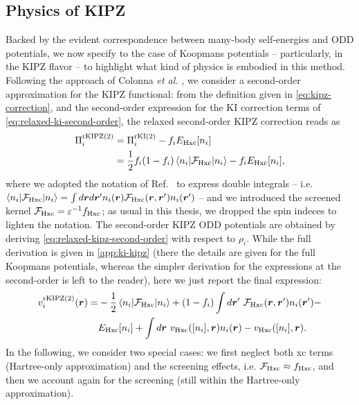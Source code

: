 \subsection{Physics of KIPZ\label{sec:kipz-cohsex}}
Backed by the evident correspondence between many-body self-energies and ODD potentials, we now specify to the case of Koopmans potentials -- particularly, in the KIPZ flavor -- to highlight what kind of physics is embodied in this method. Following the approach of Colonna \emph{et al.} \cite{colonna_koopmans-compliant_2019}, we consider a second-order approximation for the KIPZ functional: from the definition given in \cref{eq:kipz-correction}, and the second-order expression for the KI correction terms of \cref{eq:relaxed-ki-second-order}, the relaxed second-order KIPZ correction reads as
%
\begin{equation}
    \begin{split}
        \Pi_i^{\rm rKIPZ(2)} &= \Pi_i^{\rm rKI(2)} - f_i E_{\rm Hxc}[n_i] \\
        &= \frac{1}{2} f_i(1-f_i) \braket{n_i|\mathcal{F_{\rm Hxc}}|n_i} - f_i E_{\rm Hxc}[n_i] ,
    \end{split}
    \label{eq:relaxed-kipz-second-order}
\end{equation}
%
where we adopted the notation of Ref.~\cite{colonna_koopmans-compliant_2019} to express double integrals -- i.e. $\braket{n_i|\mathcal{F_{\rm Hxc}}|n_i} = \int d{\bm r} d{\bm r}' n_i({\bm r}) \mathcal{F}_{\rm Hxc}({\bm r},{\bm r}') n_i({\bm r}')$ -- and we introduced the screened kernel $\mathcal{F}_{\rm Hxc} = \varepsilon^{-1} f_{\rm Hxc}$; as usual in this thesis, we dropped the spin indeces to lighten the notation. The second-order KIPZ ODD potentials are obtained by deriving \cref{eq:relaxed-kipz-second-order} with respect to $\rho_i$. While the full derivation is given in \cref{app:ki-kipz} (there the details are given for the full Koopmans potentials, whereas the simpler derivation for the expressions at the second-order is left to the reader), here we just report the final expression:
%
\begin{equation}
    \begin{split}
        v^{\rm rKIPZ(2)}_i(\br) = &- \frac{1}{2} \braket{n_i|\mathcal{F}_{\rm Hxc}|n_i} + (1-f_i) \int d\br' \ \mathcal{F}_{\rm Hxc}(\br,\br') n_i(\br') - \\
        & E_{\rm Hxc}[n_i] + \int d\br \ v_{\rm Hxc}([n_i],\br) n_i(\br) - v_{\rm Hxc}([n_i],\br) .
    \end{split}
    \label{eq:kipz-potential-second-order}
\end{equation}
%
In the following, we consider two special cases: we first neglect both xc terms (Hartree-only approximation) and the screening effects, i.e. $\mathcal{F}_{\rm Hxc} \approx f_{\rm Hxc}$, and then we account again for the screening (still within the Hartree-only approximation).

